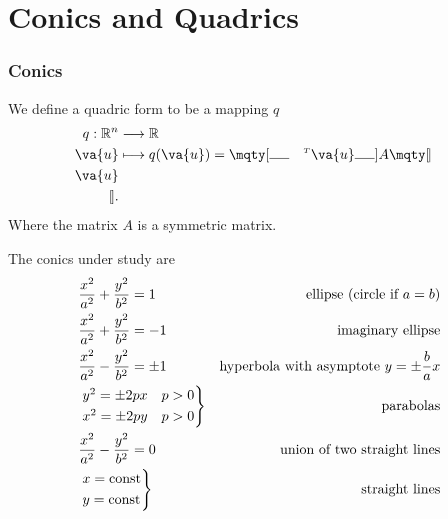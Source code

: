 \part{Conics and Quadrics}

\section{Conics}
We define a quadric form to be a mapping $q$
\begin{align*}
	q: \mathbb{R}^n & \longrightarrow \mathbb{R}                                                                                  \\
	\va{u}          & \longmapsto q(\va{u}) = \mqty[\rule{5mm}{0.4pt} & ^{\mathsmaller T}\va{u} & \rule{5mm}{0.4pt}]A\mqty[\vline \\\va{u}\\\vline]
	.\end{align*}
Where the matrix $A$ is a symmetric matrix.

The conics under study are
\begin{align*}
	 & \frac{x^2}{a^2}+\frac{y^2}{b^2}=1 \quad & \text{ellipse (circle if \(a=b\))}                \\
	 & \frac{x^2}{a^2}+\frac{y^2}{b^2}=-1      & \text{imaginary ellipse}                          \\
	 & \frac{x^2}{a^2}-\frac{y^2}{b^2}=\pm1    & \text{hyperbola with asymptote }y=\pm\frac{b}{a}x \\
	 & \begin{rcases}
		y^2=\pm 2px \quad p>0\\
		x^2=\pm 2py \quad p>0
	\end{rcases}               & \text{parabolas}                                  \\
	 & \frac{x^2}{a^2}-\frac{y^2}{b^2}=0       & \text{union of two straight lines}                \\
	 & \begin{rcases}
		x=\text{const}\\
		y=\text{const}
	\end{rcases}               & \text{straight lines}
\end{align*}


